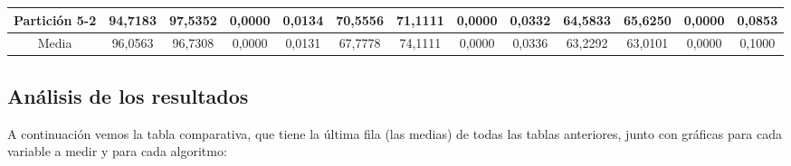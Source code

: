 \documentclass[12pt]{article}
\begin{document}
\begin{table}[H]
{\begin{tabular}{|c|cccc|cccc|cccc|}
Partición 5-2 & \multicolumn{1}{c|}{94,7183}                                                  & \multicolumn{1}{c|}{97,5352}                                                 & \multicolumn{1}{c|}{0,0000}  & 0,0134 & \multicolumn{1}{c|}{70,5556}                                                  & \multicolumn{1}{c|}{71,1111}                                                 & \multicolumn{1}{c|}{0,0000}  & 0,0332 & \multicolumn{1}{c|}{64,5833}                                                  & \multicolumn{1}{c|}{65,6250}                                                 & \multicolumn{1}{c|}{0,0000}  & 0,0853 \\ \hline
Media         & \multicolumn{1}{c|}{96,0563}                                                  & \multicolumn{1}{c|}{96,7308}                                                 & \multicolumn{1}{c|}{0,0000}  & 0,0131 & \multicolumn{1}{c|}{67,7778}                                                  & \multicolumn{1}{c|}{74,1111}                                                 & \multicolumn{1}{c|}{0,0000}  & 0,0336 & \multicolumn{1}{c|}{63,2292}                                                  & \multicolumn{1}{c|}{63,0101}                                                 & \multicolumn{1}{c|}{0,0000}  & 0,1000 \\ \hline
\end{tabular}}
\end{table}


\subsection{Análisis de los resultados}

A continuación vemos la tabla comparativa, que tiene la última fila (las medias) de todas las tablas anteriores, junto con gráficas para cada variable a medir y para cada algoritmo:
\end{document}
